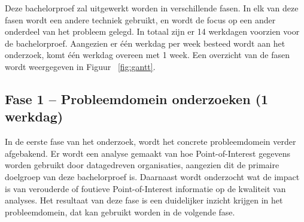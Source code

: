 



Deze bachelorproef zal uitgewerkt worden in verschillende fasen. In elk van deze fasen wordt een andere techniek gebruikt, en wordt de focus op een ander onderdeel van het probleem gelegd. In totaal zijn er 14 werkdagen voorzien voor de bachelorproef. Aangezien er één werkdag per week besteed wordt aan het onderzoek, komt één werkdag overeen met 1 week. Een overzicht van de fasen wordt weergegeven in Figuur ~\ref{fig:gantt}.

\subsection{Fase 1 – Probleemdomein onderzoeken (1 werkdag)}
In de eerste fase van het onderzoek, wordt het concrete probleemdomein verder afgebakend. Er wordt een analyse gemaakt van hoe Point-of-Interest gegevens worden gebruikt door datagedreven organisaties, aangezien dit de primaire doelgroep van deze bachelorproef is. Daarnaast wordt onderzocht wat de impact is van verouderde of foutieve Point-of-Interest informatie op de kwaliteit van analyses. Het resultaat van deze fase is een duidelijker inzicht krijgen in het probleemdomein, dat kan gebruikt worden in de volgende fase.

